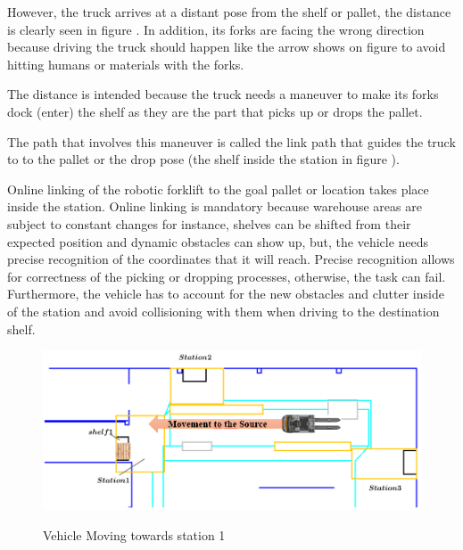 However, the truck arrives at a distant pose from the shelf or pallet,
the distance is clearly seen in figure . In addition, its forks are facing the 
wrong direction because driving the truck should happen like the arrow shows on figure  
to avoid hitting humans or materials with the forks.

The distance is intended because the truck needs a maneuver to make its forks dock (enter) the shelf
as they are the part that picks up or drops the pallet.


The path that involves this maneuver is called the link path that guides the truck to to the pallet or the drop 
pose (the shelf inside the station in figure ). 

Online linking of the robotic forklift to the goal pallet or location takes place inside
the station. Online linking is mandatory because warehouse areas are subject to constant changes for instance,
shelves can be shifted from their expected
position and dynamic obstacles can show up, but, the vehicle needs precise recognition of the coordinates 
that it will reach. 
Precise recognition allows for correctness of the picking or dropping processes, otherwise, 
the task can fail. Furthermore, the vehicle has to account for the new obstacles and clutter inside 
of the station and avoid collisioning with them when driving to the destination shelf.

\begin{figure}[H]
    \begin{center}
       \includegraphics[width=5in]{images/Chap0/move.png}\\
       \caption{Vehicle Moving towards station 1}
       \label{move}
       \end{center}
\end{figure}

